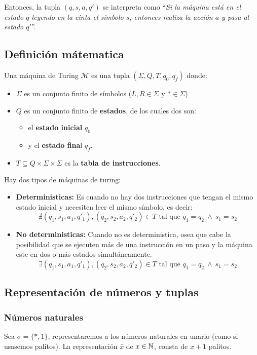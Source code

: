 	Entonces, la tupla $(q,s,a,q')$ se interpreta como ``\textit{Si la máquina está en el estado $q$ leyendo en la cinta el símbolo $s$, entonces realiza la acción $a$ y pasa al estado $q'$}''.
		
	\subsection{Definición mátematica}
	Una máquina de Turing $\mathcal{M}$ es una tupla $(\Sigma, Q, T, q_0, q_f)$ donde:
	\begin{itemize}
		\item $\Sigma$ es un conjunto finito de símbolos ($L,R\in\Sigma$ y $*\in\Sigma$)
		\item $Q$ es un conjunto finito de \textbf{estados}, de los cuales dos son:
		\begin{itemize}
			\item el \textbf{estado inicial} $q_0$
			\item y el \textbf{estado fina}l $q_f$. 
		\end{itemize}
		\item $T\subseteq Q\times\Sigma\times\Sigma$ es la \textbf{tabla de instrucciones}.
	\end{itemize}

	Hay dos tipos de máquinas de turing:
	
	\begin{itemize}
		\item \textbf{Deterministicas:} Es cuando no hay dos instrucciones que tengan el mismo estado inicial y necesiten leer el mismo símbolo, es decir:
		$$\nexists (q_1,s_1,a_1,q'_1), (q_2,s_2,a_2,q'_2) \in T \text{ tal que } q_1 = q_2~\land~s_1 = s_2$$
		\item\textbf{No deterministicas:} Cuando no es deterministica, osea que cabe la posibilidad que se ejecuten más de una instrucción en un paso y la máquina este en dos o más estados simultáneamente. 
		$$\exists (q_1,s_1,a_1,q'_1), (q_2,s_2,a_2,q'_2) \in T \text{ tal que } q_1 = q_2~\land~s_1 = s_2$$
	\end{itemize}

	\subsection{Representación de números y tuplas}
	\subsubsection{Números naturales}
	Sea $\sigma=\{*, 1\}$, representaremos a los números naturales en unario (como si usasemos palitos). La representación $\bar{x}$ de $x\in\mathbb{N}$, consta de $x+1$ palitos.
	

